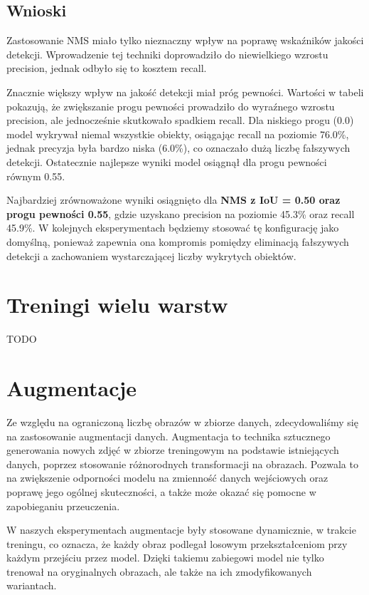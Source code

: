 \documentclass[licencjacka]{pracamgr}
\begin{document}
\subsection{Wnioski}
Zastosowanie NMS miało tylko nieznaczny wpływ na poprawę wskaźników jakości detekcji. Wprowadzenie tej techniki doprowadziło do niewielkiego wzrostu precision, jednak odbyło się to kosztem recall.   

Znacznie większy wpływ na jakość detekcji miał próg pewności. Wartości w tabeli pokazują, że zwiększanie progu pewności prowadziło do wyraźnego wzrostu precision, ale jednocześnie skutkowało spadkiem recall. Dla niskiego progu (0.0) model wykrywał niemal wszystkie obiekty, osiągając recall na poziomie 76.0\%, jednak precyzja była bardzo niska (6.0\%), co oznaczało dużą liczbę fałszywych detekcji. Ostatecznie najlepsze wyniki model osiągnął dla progu pewności równym 0.55. 

Najbardziej zrównoważone wyniki osiągnięto dla \textbf{NMS z IoU = 0.50 oraz progu pewności 0.55}, gdzie uzyskano precision na poziomie 45.3\% oraz recall 45.9\%. W kolejnych eksperymentach będziemy stosować tę konfigurację jako domyślną, ponieważ zapewnia ona kompromis pomiędzy eliminacją fałszywych detekcji a zachowaniem wystarczającej liczby wykrytych obiektów.

\section{Treningi wielu warstw}
TODO

\section{Augmentacje}

Ze względu na ograniczoną liczbę obrazów w zbiorze danych, zdecydowaliśmy się na zastosowanie augmentacji danych. Augmentacja to technika sztucznego generowania nowych zdjęć w zbiorze treningowym na podstawie istniejących danych, poprzez stosowanie różnorodnych transformacji na obrazach. Pozwala to na zwiększenie odporności modelu na zmienność danych wejściowych oraz poprawę jego ogólnej skuteczności, a także może okazać się pomocne w zapobieganiu przeuczenia.  

W naszych eksperymentach augmentacje były stosowane dynamicznie, w trakcie treningu, co oznacza, że każdy obraz podlegał losowym przekształceniom przy każdym przejściu przez model. Dzięki takiemu zabiegowi model nie tylko trenował na oryginalnych obrazach, ale także na ich zmodyfikowanych wariantach.
\end{document}
